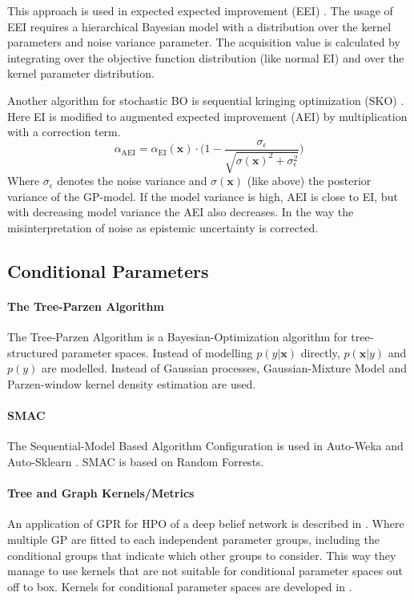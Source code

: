 \documentclass[english]{article}
\newcommand{\EI}{\operatorname{EI}}
\newcommand{\x}{\mathbf{x}}
\begin{document}
This approach is used in expected expected improvement (EEI) \cite{pandita_extending_2016}. The usage of EEI requires a hierarchical Bayesian model with a distribution over the kernel parameters and noise variance parameter. The acquisition value is calculated by integrating over the objective function distribution (like normal EI) and over the kernel parameter distribution.

Another algorithm for stochastic BO is sequential kringing optimization (SKO) \cite{huang_global_2006}. Here EI is modified to augmented expected improvement (AEI) by multiplication with a correction term.
\begin{equation}
  \alpha_{\operatorname{AEI}} = \alpha_{\EI}(\x) \cdot \bigg(1 - \frac{\sigma_\epsilon}{\sqrt{\sigma(\x)^2 + \sigma_\epsilon^2}}\bigg)
\end{equation}
Where $\sigma_\epsilon$ denotes the noise variance and $\sigma(\x)$ (like above) the posterior variance of the GP-model. If the model variance is high, AEI is close to EI, but with decreasing model variance the AEI also decreases. In the way the misinterpretation of noise as epistemic uncertainty is corrected.


\subsection{Conditional Parameters}

\paragraph{The Tree-Parzen Algorithm}
The Tree-Parzen Algorithm \cite{bergstra_algorithms_2011} is a Bayesian-Optimization algorithm for tree-structured parameter spaces. Instead of modelling $p(y|\x)$ directly, $p(\x|y)$ and $p(y)$ are modelled. Instead of Gaussian processes, Gaussian-Mixture Model and Parzen-window kernel density estimation are used.

\paragraph{SMAC}
The Sequential-Model Based Algorithm Configuration \cite{hutter_sequential_2011} is used in Auto-Weka \cite{thornton_auto-weka:_2013} and Auto-Sklearn \cite{feurer_efficient_2015}. SMAC is based on Random Forrests.

\paragraph{Tree and Graph Kernels/Metrics}
An application of GPR for HPO of a deep belief network is described in \cite{bergstra_algorithms_2011}. Where multiple GP are fitted to each independent parameter groups, including the conditional groups that indicate which other groups to consider. This way they manage to use kernels that are not suitable for conditional parameter spaces out off to box. Kernels for conditional parameter spaces are developed in \cite{swersky_raiders_2014, chandar_hierarchical_2016}.
\end{document}
